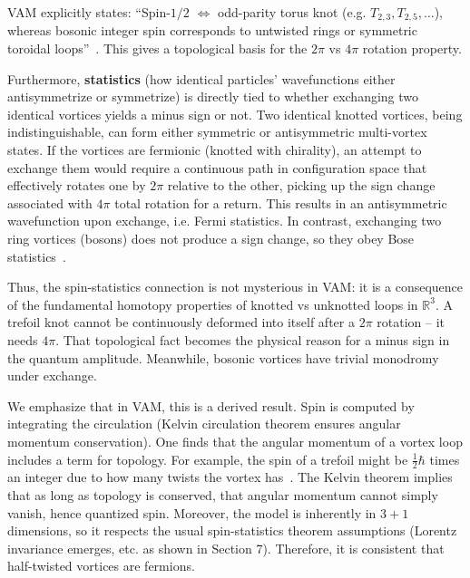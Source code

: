 \documentclass[preprint]{revtex4-2}
\begin{document}
    VAM explicitly states: “Spin-$1/2$ $\Longleftrightarrow$ odd-parity torus knot (e.g. $T_{2,3}, T_{2,5},\dots$), whereas bosonic integer spin corresponds to untwisted rings or symmetric toroidal loops”~\cite{reference_82}. This gives a topological basis for the $2\pi$ vs $4\pi$ rotation property.

    Furthermore, \textbf{statistics} (how identical particles' wavefunctions either antisymmetrize or symmetrize) is directly tied to whether exchanging two identical vortices yields a minus sign or not. Two identical knotted vortices, being indistinguishable, can form either symmetric or antisymmetric multi-vortex states. If the vortices are fermionic (knotted with chirality), an attempt to exchange them would require a continuous path in configuration space that effectively rotates one by $2\pi$ relative to the other, picking up the sign change associated with $4\pi$ total rotation for a return. This results in an antisymmetric wavefunction upon exchange, i.e. Fermi statistics. In contrast, exchanging two ring vortices (bosons) does not produce a sign change, so they obey Bose statistics~\cite{reference_83}.

    Thus, the spin-statistics connection is not mysterious in VAM: it is a consequence of the fundamental homotopy properties of knotted vs unknotted loops in $\mathbb{R}^3$. A trefoil knot cannot be continuously deformed into itself after a $2\pi$ rotation -- it needs $4\pi$. That topological fact becomes the physical reason for a minus sign in the quantum amplitude. Meanwhile, bosonic vortices have trivial monodromy under exchange.

    We emphasize that in VAM, this is a derived result. Spin is computed by integrating the circulation (Kelvin circulation theorem ensures angular momentum conservation). One finds that the angular momentum of a vortex loop includes a term for topology. For example, the spin of a trefoil might be $\frac{1}{2}\hbar$ times an integer due to how many twists the vortex has~\cite{reference_84}. The Kelvin theorem implies that as long as topology is conserved, that angular momentum cannot simply vanish, hence quantized spin. Moreover, the model is inherently in $3+1$ dimensions, so it respects the usual spin-statistics theorem assumptions (Lorentz invariance emerges, etc. as shown in Section 7). Therefore, it is consistent that half-twisted vortices are fermions.
\end{document}
